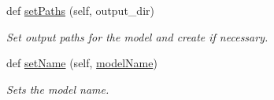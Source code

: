 \begin{DoxyCompactItemize}
def \mbox{\hyperlink{classamici_1_1ode__export_1_1_o_d_e_exporter_a30886da9525f87826d3da2543a4aebbd}{set\+Paths}} (self, output\+\_\+dir)
\begin{DoxyCompactList}\small\item\em Set output paths for the model and create if necessary. \end{DoxyCompactList}\item 
def \mbox{\hyperlink{classamici_1_1ode__export_1_1_o_d_e_exporter_af9ec4a20beb62b41663733ecfc8e1713}{set\+Name}} (self, \mbox{\hyperlink{classamici_1_1ode__export_1_1_o_d_e_exporter_adefaf64a0bbe772b9463fa2a9cba904e}{model\+Name}})
\begin{DoxyCompactList}\small\item\em Sets the model name. \end{DoxyCompactList}\end{DoxyCompactItemize}
